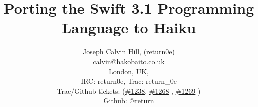 \documentclass[12pt]{article}
\title{\vspace{-1.5cm}Porting the Swift 3.1 Programming Language to Haiku}
\begin{document}
\date{}
\author{Joseph Calvin Hill, (return0e)\\ calvin@hakobaito.co.uk\\London, UK,\\
IRC: return0e, Trac: return\_0e\\
Trac/Github tickets: (\href{http://github.com/haikuports/haikuports/pull/1238}{\#1238}, \href{http://github.com/haikuports/haikuports/pull/1268}{\#1268} , \href{http://github.com/haikuports/haikuports/pull/1269}{\#1269} )\\
Github: @return\\}
\maketitle
\thispagestyle{fancy}
\vspace{-1cm}
\end{document}
